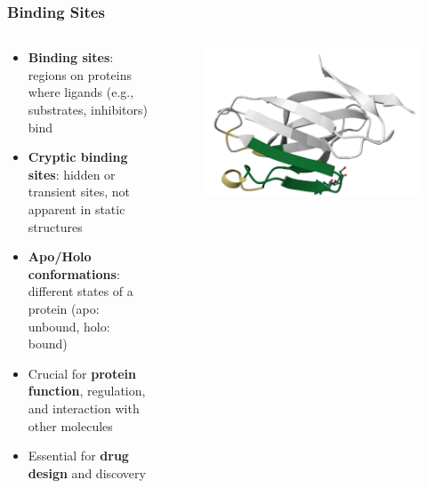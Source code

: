 \documentclass[aspectratio=169]{beamer}
\begin{document}
\begin{frame}
  \frametitle{Binding Sites}

  \begin{columns}
    \begin{column}{0.6\textwidth}
      \begin{itemize}
        \item \textbf{Binding sites}: regions on proteins where ligands (e.g., substrates, inhibitors) bind
        \item \textbf{Cryptic binding sites}: hidden or transient sites, not apparent in static structures
        \item \textbf{Apo/Holo conformations}: different states of a protein (apo: unbound, holo: bound)
      \end{itemize}

      \begin{itemize}
        \item Crucial for \textbf{protein function}, regulation, and interaction with other molecules
        \item Essential for \textbf{drug design} and discovery
      \end{itemize}
    \end{column}
    \begin{column}{0.4\textwidth}
      \begin{figure}
        \includegraphics[width=\textwidth]{fig/5eli_color.png}
      \end{figure}
    \end{column}
  \end{columns}

\end{frame}
\end{document}
